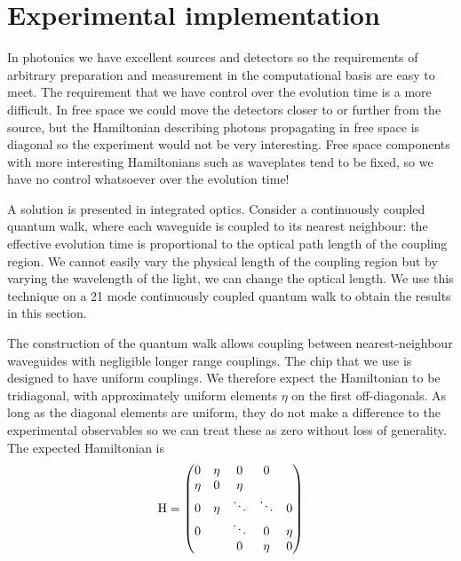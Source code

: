 \section{Experimental implementation}
\label{sec:HTExperiment}
In photonics we have excellent sources \cite{sources-kwiat,
sources-josh} and detectors \cite{detectors-yale, detectors-sprengers} so the
requirements of arbitrary preparation and measurement in the computational basis
are easy to meet. The requirement that we have control over the evolution time
is a more difficult. In free space we could move the detectors closer to or
further from the source, but the Hamiltonian describing photons propagating in
free space is diagonal so the experiment would not be very interesting. Free
space components with more interesting Hamiltonians such as waveplates tend to
be fixed, so we have no control whatsoever over the evolution time!

A solution is presented in integrated optics. Consider a continuously coupled
quantum walk, where each waveguide is coupled to its nearest neighbour: the
effective evolution time is proportional to the optical path length of the
coupling region. We cannot easily vary the physical length of the coupling
region \cite{walks-jasmin} but by varying the wavelength of the light, we can
change the optical length. We use this technique on a 21 mode continuously
coupled quantum walk to obtain the results in this section.

The construction of the quantum walk allows coupling between nearest-neighbour
waveguides with negligible longer range couplings. The chip that we use is
designed to have uniform couplings. We therefore expect the Hamiltonian to be
tridiagonal, with approximately uniform elements \(\eta\) on the first
off-diagonals. As long as the diagonal elements are uniform, they do not make a
difference to the experimental observables so we can treat these as zero without
loss of generality. The expected Hamiltonian is
\begin{equation}
  \mathrm{H} = \begin{pmatrix}
  0 & \eta & 0 & 0 \\
  \eta & 0 & \eta \\
  0 & \eta & \ddots & \ddots & 0 \\
  0 & & \ddots & 0 & \eta \\
  & & 0 & \eta & 0
  \end{pmatrix}
\end{equation}

